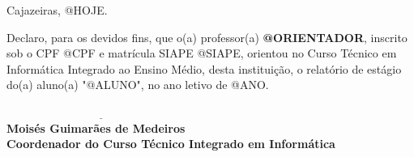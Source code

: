 \documentclass[a4paper, 12pt]{letter}
\begin{document}
\vspace{1.5cm}

\begin{flushright}
Cajazeiras, @HOJE.
\end{flushright}

\vspace{2cm}

Declaro, para os devidos fins, que o(a) professor(a) {\bf @ORIENTADOR}, inscrito sob o CPF @CPF e matrícula SIAPE @SIAPE, orientou no Curso Técnico em Informática Integrado ao Ensino Médio, desta instituição, o relatório de estágio do(a) aluno(a) "@ALUNO", no ano letivo de @ANO.

\vspace{2cm}

{\bf
\indent $\underline{\hspace{7cm}}$\\
\indent Moisés Guimarães de Medeiros\\
\indent Coordenador do Curso Técnico Integrado em Informática\\
}
\end{document}
